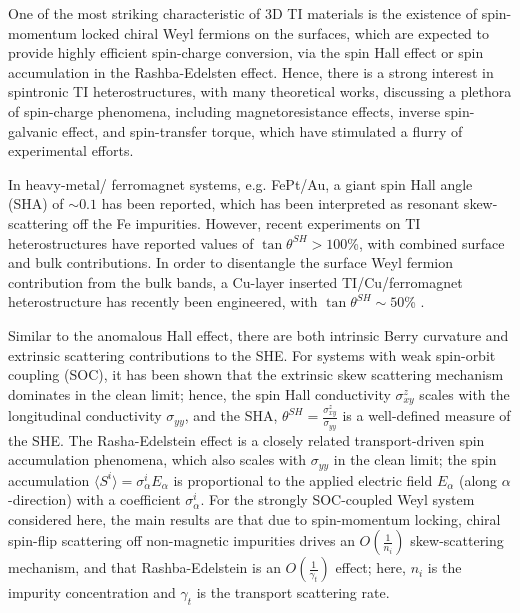 \documentclass[twocolumn,epsfig,a4paper,amsmath,amssymb,showpacs,prl,superscriptaddress]{revtex4-1}
\begin{document}
One of the most striking characteristic of 3D TI materials is the existence of spin-momentum locked chiral Weyl fermions on the surfaces, which are expected to provide highly efficient spin-charge conversion\cite{FertNatComms2013, ShiomiSaitohPRL2014}, via the spin Hall effect or spin accumulation in the Rashba-Edelsten effect\cite{EdelsteinSSC1990}. Hence, there is a strong interest in spintronic TI heterostructures, with many theoretical works\cite{ShankarMondalPRB2010, DasSarmaCulcerPRB2010,BurkovHawthornPRL2010,FranzGaratePRL2010,NagaosaZangPRB2010,NagaosaBranislavPRL2012}, discussing a plethora of spin-charge phenomena, including magnetoresistance effects, inverse spin-galvanic effect, and spin-transfer torque, which have stimulated a flurry of experimental efforts\cite{RalphMellnikNature2014, LiJonkerNNano2014, ShiomiSaitohPRL2014, AndoNanoLett2014, KangNatMat2014, TokuraKondouNatPhys2016}.

In heavy-metal/ ferromagnet systems, e.g. FePt/Au, a giant spin Hall angle (SHA) of $\sim 0.1$ has been reported\cite{SekiTakanashiNatMat2008}, which has been interpreted as resonant skew-scattering off the Fe impurities\cite{GuNagaosaPRL2009}. However, recent experiments on TI heterostructures\cite{KangNatMat2014,RalphMellnikNature2014} have reported values of $\tan \theta^{SH} > 100$\%, with combined surface and bulk contributions. In order to disentangle the surface Weyl fermion contribution from the bulk bands, a Cu-layer inserted TI/Cu/ferromagnet heterostructure has recently been engineered, with $\tan \theta^{SH} \sim 50$\% \cite{TokuraKondouNatPhys2016}. 

Similar to the anomalous Hall effect, there are both intrinsic Berry curvature and extrinsic scattering contributions to the SHE. For systems with weak spin-orbit coupling (SOC), it has been shown\cite{HalperinRashbaPRL2005} that the extrinsic skew scattering mechanism dominates in the clean limit; hence, the spin Hall conductivity $\sigma^z_{xy}$ scales with the longitudinal conductivity $\sigma_{yy}$, and the SHA, $\theta^{SH} = \tfrac{\sigma^z_{xy}}{\sigma_{yy}}$ is a well-defined measure of the SHE. The Rasha-Edelstein effect is a closely related transport-driven spin accumulation phenomena, which also scales with $\sigma_{yy}$ in the clean limit; the spin accumulation $\langle S^i \rangle = \sigma^i_{\alpha} E_{\alpha}$ is proportional to the applied electric field $E_{\alpha}$ (along $\alpha$-direction) with a coefficient $\sigma^i_{\alpha}$. For the strongly SOC-coupled Weyl system considered here, the main results are that due to spin-momentum locking, chiral spin-flip scattering off non-magnetic impurities drives an $O(\tfrac{1}{n_i})$ skew-scattering mechanism, and that Rashba-Edelstein is an $O(\tfrac{1}{\gamma_t})$ effect; here, $n_i$ is the impurity concentration and $\gamma_t$ is the transport scattering rate.
\end{document}
